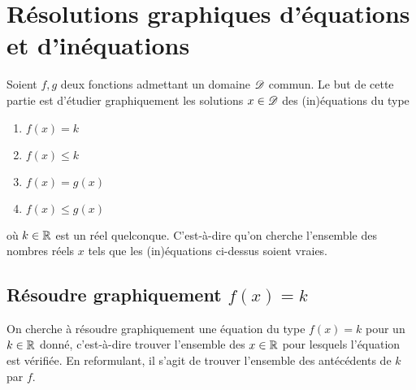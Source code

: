 


\section{Résolutions graphiques d'équations et d'inéquations}

Soient $f, g$ deux fonctions admettant un domaine $\mathcal{D}$ commun.
Le but de cette partie est d'étudier graphiquement les solutions $x\in\mathcal{D}$ des (in)équations du type
	\begin{multicols}{2}
	\begin{enumerate}[label=$\bullet$]
		\item $f(x) = k$
		\item $f(x) \leq k$
		\item $f(x) = g(x)$
		\item $f(x) \leq g(x)$
	\end{enumerate}
	\end{multicols}
\noindent où $k\in\mathbb{R}$ est un réel quelconque.
C'est-à-dire qu'on cherche l'ensemble des nombres réels $x$ tels que les (in)équations ci-dessus soient vraies.

\subsection{Résoudre graphiquement $f(x) = k$}


On cherche à résoudre graphiquement une équation du type $f(x)=k$ pour un $k\in\mathbb{R}$ donné, c'est-à-dire trouver l'ensemble des $x\in\mathbb{R}$ pour lesquels l'équation est vérifiée.
En reformulant, il s'agit de trouver l'ensemble des antécédents de $k$ par $f$. 

